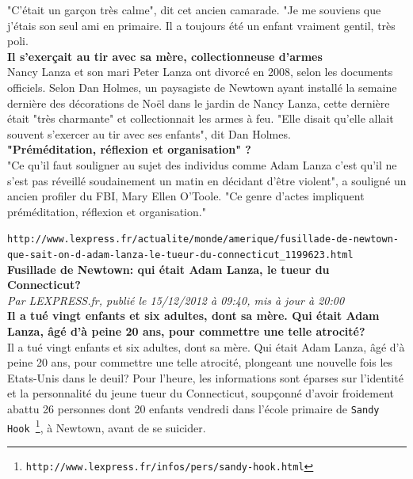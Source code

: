 \documentclass[11pt,twoside,a4paper]{article}
\begin{document}
	"C'{\'e}tait un gar\c{c}on tr{\`e}s calme", dit cet ancien camarade. "Je me souviens que j'{\'e}tais son seul ami en primaire. Il a toujours {\'e}t{\'e} un enfant vraiment gentil, tr{\`e}s poli. ~\\
	
	\textbf{Il s'exer\c{c}ait au tir avec sa m{\`e}re, collectionneuse d'armes}~\\
	
	Nancy Lanza et son mari Peter Lanza ont divorc{\'e} en 2008, selon les documents officiels. Selon Dan Holmes, un paysagiste de Newtown ayant install{\'e} la semaine derni{\`e}re des d{\'e}corations de No{\"e}l dans le jardin de Nancy Lanza, cette derni{\`e}re {\'e}tait "tr{\`e}s charmante" et collectionnait les armes {\`a} feu. "Elle disait qu'elle allait souvent s'exercer au tir avec ses enfants", dit Dan Holmes. ~\\
	
	\textbf{"Pr{\'e}m{\'e}ditation, r{\'e}flexion et organisation" ?}~\\
	
	"Ce qu'il faut souligner au sujet des individus comme Adam Lanza c'est qu'il ne s'est pas r{\'e}veill{\'e} soudainement un matin en d{\'e}cidant d'{\^e}tre violent", a soulign{\'e} un ancien profiler du FBI, Mary Ellen O'Toole. "Ce genre d'actes impliquent pr{\'e}m{\'e}ditation, r{\'e}flexion et organisation." ~\\

\dotfill

\texttt{http://www.lexpress.fr/actualite/monde/amerique/fusillade-de-newtown-que-sait-on-d-adam-lanza-le-tueur-du-connecticut\_1199623.html}~\\

\textbf{\large Fusillade de Newtown: qui {\'e}tait Adam Lanza, le tueur du Connecticut?}~\\

\emph{\small Par LEXPRESS.fr, publi{\'e} le 15/12/2012 {\`a} 09:40, mis {\`a} jour {\`a} 20:00}~\\

\textbf{Il a tu{\'e} vingt enfants et six adultes, dont sa m{\`e}re. Qui {\'e}tait Adam Lanza, {\^a}g{\'e} d'{\`a} peine 20 ans, pour commettre une telle atrocit{\'e}?}~\\ 

Il a tu{\'e} vingt enfants et six adultes, dont sa m{\`e}re. Qui {\'e}tait Adam Lanza, {\^a}g{\'e} d'{\`a} peine 20 ans, pour commettre une telle atrocit{\'e}, plongeant une nouvelle fois les Etats-Unis dans le deuil? Pour l'heure, les informations sont {\'e}parses sur l'identit{\'e} et la personnalit{\'e} du jeune tueur du Connecticut, soup\c{c}onn{\'e} d'avoir froidement abattu 26 personnes dont 20 enfants vendredi dans l'{\'e}cole primaire de \texttt{Sandy Hook~\footnote{\texttt{http://www.lexpress.fr/infos/pers/sandy-hook.html}}}, {\`a} Newtown, avant de se suicider. ~\\  
\end{document}
